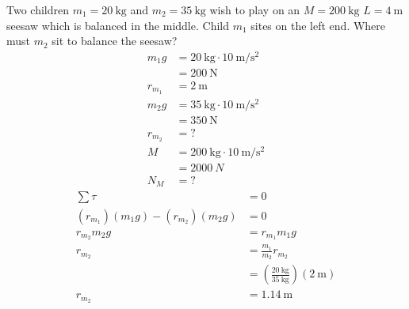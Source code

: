 \documentclass{article}
\begin{document}
Two children $ m_1 = \SI{20}{\kilogram} $ and $ m_2 = \SI{35}{\kilogram} $ wish to play on an $ M = \SI{200}{\kilogram} $ $ L = \SI{4}{\meter} $ seesaw which is balanced in the middle. Child $ m_1 $ sites on the left end. Where must $ m_2 $ sit to balance the seesaw?
\begin{align*}
	m_1g & = \SI{20}{\kilogram} \cdot \SI{10}{\meter \per \second \squared} \\
		 & = \SI{200}{\newton} \\
	r_{m_1} & = \SI{2}{\meter} \\
	m_2g & = \SI{35}{\kilogram} \cdot \SI{10}{\meter \per \second \squared} \\
		 & = \SI{350}{\newton} \\
	r_{m_2} & = ? \\
	M & = \SI{200}{\kilogram} \cdot \SI{10}{\meter \per \second \squared} \\
	  & = \SI{2000}{N} \\
	N_M & = ?
\end{align*}
\begin{align*}
	\sum \tau & = 0 \\
	(r_{m_1})(m_1g) - (r_{m_2})(m_2g) & = 0 \\
	r_{m_2}m_2g & = r_{m_1}m_1g \\
	r_{m_2} & = \frac{m_1}{m_2}r_{m_2} \\
			& = \left( \frac{\SI{20}{\kilogram}}{\SI{35}{\kilogram}} \right) \left( \SI{2}{\meter} \right) \\
	r_{m_2} & = \SI{1.14}{\meter}
\end{align*}

\hr
\end{document}
